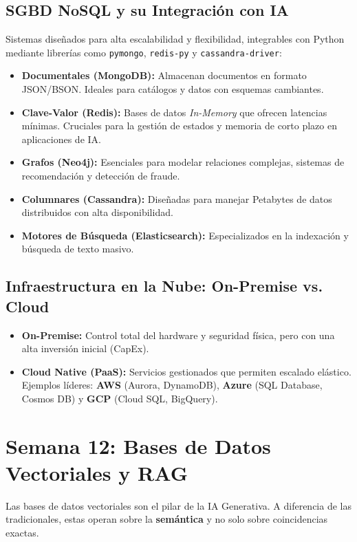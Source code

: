 \documentclass[12pt,a4paper,openany,oneside]{book}
\begin{document}
\subsection{SGBD NoSQL y su Integración con IA}
Sistemas diseñados para alta escalabilidad y flexibilidad, integrables con Python mediante librerías como \texttt{pymongo}, \texttt{redis-py} y \texttt{cassandra-driver}:
\begin{itemize}
    \item \textbf{Documentales (MongoDB):} Almacenan documentos en formato JSON/BSON. Ideales para catálogos y datos con esquemas cambiantes.
    \item \textbf{Clave-Valor (Redis):} Bases de datos \textit{In-Memory} que ofrecen latencias mínimas. Cruciales para la gestión de estados y memoria de corto plazo en aplicaciones de IA.
    \item \textbf{Grafos (Neo4j):} Esenciales para modelar relaciones complejas, sistemas de recomendación y detección de fraude.
    \item \textbf{Columnares (Cassandra):} Diseñadas para manejar Petabytes de datos distribuidos con alta disponibilidad.
    \item \textbf{Motores de Búsqueda (Elasticsearch):} Especializados en la indexación y búsqueda de texto masivo.
\end{itemize}

\subsection{Infraestructura en la Nube: On-Premise vs. Cloud}
\begin{itemize}
    \item \textbf{On-Premise:} Control total del hardware y seguridad física, pero con una alta inversión inicial (CapEx).
    \item \textbf{Cloud Native (PaaS):} Servicios gestionados que permiten escalado elástico. Ejemplos líderes: \textbf{AWS} (Aurora, DynamoDB), \textbf{Azure} (SQL Database, Cosmos DB) y \textbf{GCP} (Cloud SQL, BigQuery).
\end{itemize}



\section{Semana 12: Bases de Datos Vectoriales y RAG}

Las bases de datos vectoriales son el pilar de la IA Generativa. A diferencia de las tradicionales, estas operan sobre la \textbf{semántica} y no solo sobre coincidencias exactas.
\end{document}
